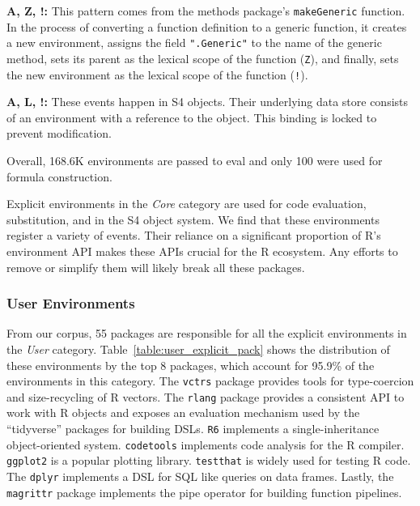 \documentclass[10pt,review,sigplan,authorversion=true]{acmart}
\newcommand{\code}[1]{\lstinline |#1|\xspace}
\begin{document}
\noindent
\textbf{A, Z, !:} This pattern comes from the methods package's
\code{makeGeneric} function. In the process of converting a function definition
to a generic function, it creates a new environment, assigns the field
\code{".Generic"} to the name of the generic method, sets its parent as the
lexical scope of the function (\texttt{Z}), and finally, sets the new
environment as the lexical scope of the function (\texttt{!}).

\noindent
\textbf{A, L, !:} These events happen in S4 objects. Their underlying data store
consists of an environment with a reference to the object. This binding is
locked to prevent modification.

Overall, 168.6K environments are passed to eval and only 100 were used for
formula construction.

Explicit environments in the \emph{Core} category are used for code evaluation,
substitution, and in the S4 object system. We find that these environments
register a variety of events. Their reliance on a significant proportion of R's
environment API makes these APIs crucial for the R ecosystem. Any efforts to
remove or simplify them will likely break all these packages.

\subsubsection{User Environments}

From our corpus, 55 packages are responsible for all the explicit environments
in the \emph{User} category. Table~\ref{table:user_explicit_pack} shows the
distribution of these environments by the top 8 packages, which account for
95.9\% of the environments in this category. The \code{vctrs} package provides
tools for type-coercion and size-recycling of R vectors. The \code{rlang}
package provides a consistent API to work with R objects and exposes an
evaluation mechanism used by the ``tidyverse'' packages for building DSLs.
\code{R6} implements a single-inheritance object-oriented system.
\code{codetools} implements code analysis for the R compiler. \code{ggplot2} is
a popular plotting library. \code{testthat} is widely used for testing R code.
The \code{dplyr} implements a DSL for SQL like queries on data frames.
Lastly, the \code{magrittr} package implements the pipe operator for building
function pipelines.
\end{document}
